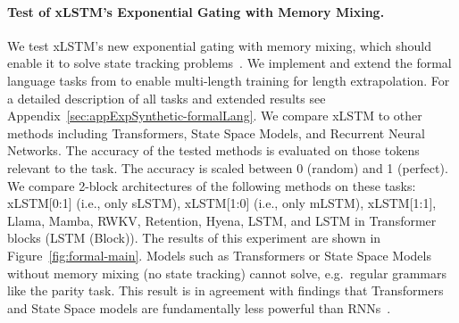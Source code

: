 \documentclass[dvipsnames]{article}
\begin{document}
\paragraph{Test of xLSTM's Exponential Gating with Memory Mixing.}
We test xLSTM's new exponential gating with memory mixing,
which should enable it to solve state tracking problems~\citep{Merrill:24, Merrill:23}.
We implement and extend the formal language tasks from \citet{Deletang:23}
to enable multi-length training for length extrapolation. 
For a detailed description of all tasks and extended results see 
Appendix~\ref{sec:appExpSynthetic-formalLang}. 
We compare xLSTM to other methods including Transformers, State Space Models,
and Recurrent Neural Networks.
The accuracy of the tested methods is evaluated
on those tokens relevant to the task.
The accuracy is scaled between 0 (random) and 1 (perfect).
We compare 2-block architectures of the following methods on these tasks: 
xLSTM[0:1] (i.e., only sLSTM), 
xLSTM[1:0] (i.e., only mLSTM), 
xLSTM[1:1],
Llama, 
Mamba,
RWKV, 
Retention, 
Hyena, 
LSTM, and
LSTM in Transformer blocks (LSTM (Block)).
The results of this experiment are shown in Figure~\ref{fig:formal-main}.
Models such as Transformers or State Space Models without memory mixing (no state tracking) 
cannot solve, e.g.\ regular grammars like the parity task. 
This result is in agreement with findings that 
Transformers and State Space models are fundamentally 
less powerful than RNNs~\citep{Merrill:24, Merrill:23, Deletang:23}. 
\end{document}
